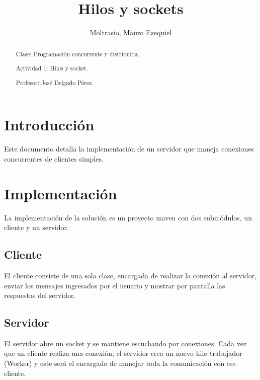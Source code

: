 \documentclass[a4paper]{article}
\begin{document}
\title{Hilos y sockets}
\author{Moltrasio, Mauro Ezequiel}
\date{}
\renewcommand{\abstractname}{\vspace{-\baselineskip}}

\begin{titlingpage}
    \maketitle
    \begin{abstract}

        Clase: Programación concurrente y distribuida.

        Actividad 1: Hilos y socket.

        Profesor: José Delgado Pérez.
    \end{abstract}
\end{titlingpage}

\maketitle
\tableofcontents

\section{Introducción}

Este documento detalla la implementación de un servidor que maneja conexiones
concurrentes de clientes simples.

\section{Implementación}

La implementación de la solución es un proyecto maven con dos submódulos, un
cliente y un servidor.

\subsection{Cliente}

El cliente consiste de una sola clase, encargada de realizar la conexión al
servidor, enviar los mensajes ingresados por el usuario y mostrar por pantalla
las respuestas del servidor.

\subsection{Servidor}

El servidor abre un socket y se mantiene escuchando por conexiones. Cada vez
que un cliente realiza una conexión, el servidor crea un nuevo hilo trabajador
(Worker) y este será el encargado de manejar toda la comunicación con ese
cliente.
\end{document}
